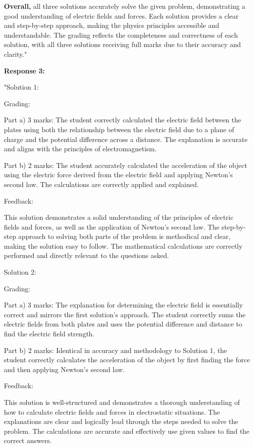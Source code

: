 \documentclass[a4paper,11pt]{article}
\begin{document}
\textbf{Overall,} all three solutions accurately solve the given problem, demonstrating a good understanding of electric fields and forces. Each solution provides a clear and step-by-step approach, making the physics principles accessible and understandable. The grading reflects the completeness and correctness of each solution, with all three solutions receiving full marks due to their accuracy and clarity."

\textbf{Response 3:}

"Solution 1:

Grading:

Part a) 3 marks: The student correctly calculated the electric field between the plates using both the relationship between the electric field due to a plane of charge and the potential difference across a distance. The explanation is accurate and aligns with the principles of electromagnetism.

Part b) 2 marks: The student accurately calculated the acceleration of the object using the electric force derived from the electric field and applying Newton's second law. The calculations are correctly applied and explained.

Feedback:

This solution demonstrates a solid understanding of the principles of electric fields and forces, as well as the application of Newton's second law. The step-by-step approach to solving both parts of the problem is methodical and clear, making the solution easy to follow. The mathematical calculations are correctly performed and directly relevant to the questions asked.

Solution 2:

Grading:

Part a) 3 marks: The explanation for determining the electric field is essentially correct and mirrors the first solution's approach. The student correctly sums the electric fields from both plates and uses the potential difference and distance to find the electric field strength.

Part b) 2 marks: Identical in accuracy and methodology to Solution 1, the student correctly calculates the acceleration of the object by first finding the force and then applying Newton's second law.

Feedback:

This solution is well-structured and demonstrates a thorough understanding of how to calculate electric fields and forces in electrostatic situations. The explanations are clear and logically lead through the steps needed to solve the problem. The calculations are accurate and effectively use given values to find the correct answers.
\end{document}

